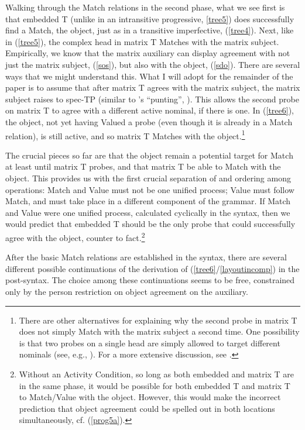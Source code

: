 \documentclass[output=paper
,modfonts
,nonflat]{langsci/langscibook}
\begin{document}
\noindent Walking through the Match relations in the second phase, what we see first is that embedded T (unlike in an intransitive progressive, \ref{tree5}) does successfully find a Match, the object, just as in a transitive imperfective, (\ref{tree4}). Next, like in (\ref{tree5}), the complex head in matrix T Matches with the matrix subject. Empirically, we know that the matrix auxiliary can display agreement with not just the matrix subject, (\ref{sos}), but also with the object, (\ref{sdo}). There are several ways that we might understand this. What I will adopt for the remainder of the paper is to assume that after matrix T agrees with the matrix subject, the matrix subject raises to spec-TP (similar to \citeauthor{AnandNevins06}'s ``punting'', \citeyear{AnandNevins06}). This allows the second probe on matrix T to agree with a different active nominal, if there is one. In (\ref{tree6}), the object, not yet having Valued a probe (even though it is already in a Match relation), is still active, and so matrix T Matches with the object.\footnote{There are other alternatives for explaining why the second probe in matrix T does not simply Match with the matrix subject a second time. One possibility is that two probes on a single head are simply allowed to target different nominals (see, e.g., \citealt{Keine10}). For a more extensive discussion, see \citet[fn. 12]{Georgi12}.}

The crucial pieces so far are that the object remain a potential target for Match at least until matrix T probes, and that matrix T be able to Match with the object. This provides us with the first crucial separation of and ordering among operations: Match and Value must not be one unified process; Value must follow Match, and must take place in a different component of the grammar. If Match and Value were one unified process, calculated cyclically in the syntax, then we would predict that embedded T should be the only probe that could successfully agree with the object, counter to fact.\footnote{Without an Activity Condition, so long as both embedded and matrix T are in the same phase, it would be possible for both embedded T and matrix T to Match/Value with the object. However, this would make the incorrect prediction that object agreement could be spelled out in both locations simultaneously, cf. (\ref{prog5a}).}  

After the basic Match relations are established in the syntax, there are several different possible continuations of the derivation of (\ref{tree6}/\ref{layoutincomp}) in the post-syntax. The choice among these continuations seems to be free, constrained only by the person restriction on object agreement on the auxiliary. 
\end{document}
